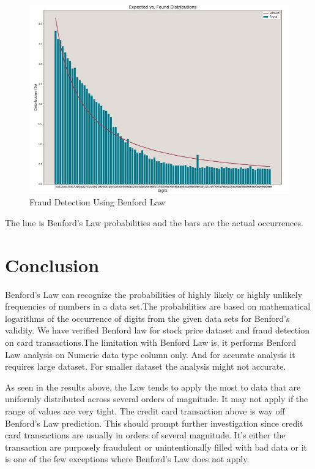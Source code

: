 \begin{figure}[!ht]
\centering\includegraphics[width=\columnwidth]{images/benford_card_transactions.JPG}
  \caption{Fraud Detection Using Benford Law}\label{f:card-ds-benfordlaw}
\end{figure}

The line is Benford’s Law probabilities and the bars are 
the actual occurrences.


\section{Conclusion}
Benford’s Law can recognize the probabilities of highly  likely or 
highly unlikely frequencies of numbers in a data set.The 
probabilities are based on mathematical logarithms of the occurrence 
of digits from the given data sets for Benford's validity. We have 
verified Benford law for stock price dataset and fraud detection on 
card transactions.The limitation with Benford Law is, it performs 
Benford Law analysis on Numeric data type column only. 
And for accurate analysis it requires large dataset.
For smaller dataset the analysis might not accurate.

As seen in the results above, the Law tends to apply the most 
to data that are uniformly distributed across several orders of magnitude. 
It may not apply if the range of values are very tight. 
The credit card transaction above is way off Benford’s 
Law prediction. This should prompt further investigation 
since credit card transactions are usually in orders of several 
magnitude. It’s either the transaction are purposely fraudulent 
or unintentionally filled with bad data or it is one 
of the few exceptions where Benford’s Law does not apply.



 
